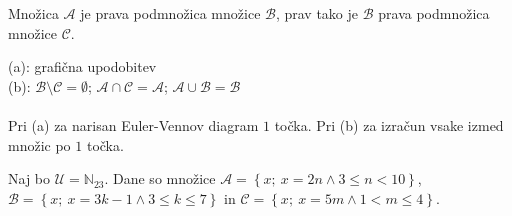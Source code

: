 \documentclass[addpoints]{exam}
\begin{document}
\begin{questions}
    \question
    Množica $\mathcal{A}$ je prava podmnožica množice $\mathcal{B}$, prav tako je $\mathcal{B}$ prava podmnožica množice $\mathcal{C}$.

    \begin{solution}[1cm]
        (a): grafična upodobitev \\
        (b): $\mathcal{B}\setminus\mathcal{C}=\emptyset$; $\mathcal{A}\cap\mathcal{C}=\mathcal{A}$; $\mathcal{A}\cup\mathcal{B}=\mathcal{B}$ \\ \\
        Pri (a) za narisan Euler-Vennov diagram $1$ točka. Pri (b) za izračun vsake izmed množic po $1$ točka.
    \end{solution}





    \question
    Naj bo $\mathcal{U}=\mathbb{N}_{23}$. Dane so množice $\mathcal{A}=\left\{x;\ x=2n \land 3\leq n<10\right\}$, $\mathcal{B}=\left\{x;\ x=3k-1 \land 3\leq k\leq 7\right\}$ in $\mathcal{C}=\left\{x;\ x=5m \land 1<m\leq 4\right\}$. 


\end{questions}
\end{document}
